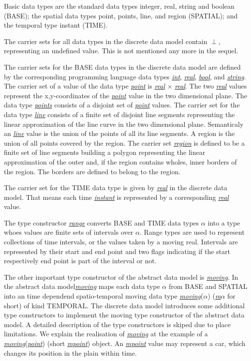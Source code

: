 \documentclass[a4paper]{article}
\newcommand{\dt}[1]{\textsl{\underline{#1}}}
\begin{document}
Basic data types are the standard data types integer, real, string and boolean
(BASE);
the spatial data types point, points, line, and region (SPATIAL);
and the temporal type instant (TIME).

The carrier sets for all data types in the discrete data model contain $\perp$,
representing an undefined value. This is not mentioned any more in the sequel.

The carrier sets for the BASE data types in the discrete data model are defined
by the corresponding programming language data types \dt{int}, \dt{real}, \dt{bool},
and \dt{string}. The carrier set of a value of the data type \dt{point} is
\dt{real} $\times$ \dt{real}. The two \dt{real} values represent the x,y-coordinates
of the \dt{point} value in the two dimensional plane. The data type \dt{points}
consists of a disjoint set of \dt{point} values. The carrier set for the data
type \dt{line}
consists of a finite set of disjoint line segments representing the linear
approximation of the line curve in the two dimensional plane. Semanticaly an
\dt{line} value is the union of the points of all its line segments. A region
is the union of all points covered by the region. The carrier set \dt{region}
is defined to be a finite set of line segments building a polygon representing
the linear approximation of the outer and, if the region contains wholes, inner
borders of the region. The borders are defined to belong to the region.

The carrier set for the TIME data type is given by \dt{real} in the discrete
data model.
That means each time \dt{instant} is represented by a corresponding \dt{real}
value.

The type constructor \dt{range} converts BASE and TIME data types $\alpha$ into
a type whoes values are finite sets of intervals over $\alpha$. Range types are
used to represent collections of time intervals, or the values taken by a moving
real. Intervals are represented by their start and end point and two flags
indicating
if the start respectively end point is part of the interval or not.

The other important type constructor of the abstract data model is \dt{moving}.
In the abstract data model\dt{moving} maps each data type $\alpha$ from BASE and
SPATIAL into an time dependend spatio-temporal moving data type
\dt{moving}($\alpha$)
(\dt{m$\alpha$} for short) of kind TEMPORAL. The discrete data model introduces some
additional type constructors to implement the moving type constructor of the
abstract data model. A detailed description of the type constructors is skiped
due to place limitations. We explain the realisation of \dt{moving} at the example
of a \dt{moving}(\dt{point}) (short \dt{mpoint}) object. An \dt{mpoint} value
may represent a car, which changes its position in the plain within time.
\end{document}
